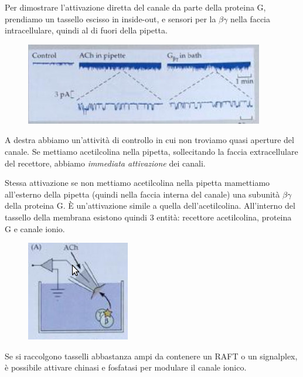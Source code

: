 \documentclass[a4paper,12pt]{article}
\begin{document}
Per dimostrare l'attivazione diretta del canale da parte della proteina G, prendiamo un tassello escisso in inside-out, e sensori per la $\beta \gamma$ nella faccia intracellulare, quindi al di fuori della pipetta.

\begin{figure}[H]
\centering
\includegraphics[scale=0.5]{immagine/tassello.jpg}
\caption{}
\label{img:frat}
\end{figure} 

A destra abbiamo un'attività di controllo in cui non troviamo quasi aperture del canale. Se mettiamo acetilcolina nella pipetta, sollecitando la faccia extracellulare del recettore, abbiamo \emph{immediata attivazione} dei canali.

Stessa attivazione se non mettiamo acetilcolina nella pipetta mamettiamo all'esterno della pipetta (quindi nella faccia interna del canale) una subunità $\beta \gamma$ della proteina G. È un'attivazione simile a quella dell'acetilcolina. All'interno del tassello della membrana esistono quindi 3 entità: recettore acetilcolina, proteina G e canale ionio.
\begin{figure}[H]
\centering
\includegraphics[scale=0.5]{immagine/ach.jpg}
\caption{}
\label{img:frat}
\end{figure} 

Se si raccolgono tasselli abbastanza ampi da contenere un RAFT o un signalplex, è possibile attivare chinasi e fosfatasi per modulare il canale ionico.
\end{document}
